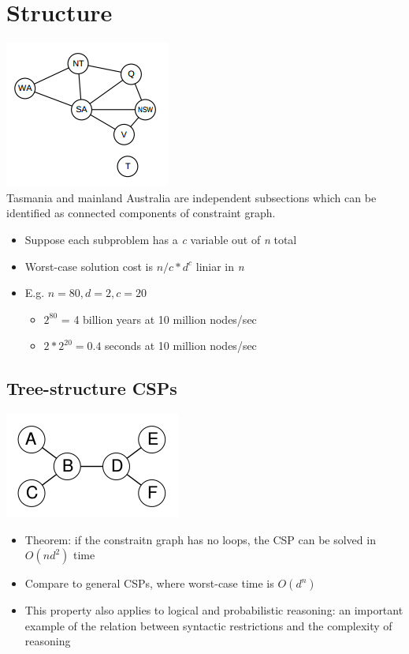 \section{Structure}
\includegraphics[scale=1]{chap1_pics/australiamap.png}\\
Tasmania and mainland Australia are independent subsections which can be identified as connected components of constraint graph. \\

\begin{itemize}
\item Suppose each subproblem has a \textit{c} variable out of \textit{n} total
\item Worst-case solution cost is $ n/c * d^c$ liniar in \textit{n}
\item E.g. $n = 80, d = 2, c =20$
\begin{itemize}
\item $2^{80}$ = 4 billion years at 10 million nodes/sec
\item $2 * 2^{20} = 0.4$ seconds at 10 million nodes/sec
\end{itemize}
\end{itemize} 

\subsection{Tree-structure CSPs}
\includegraphics[scale=1]{chap1_pics/treestructure.png}

\begin{itemize}
\item Theorem: if the constraitn graph has no loops, the CSP can be solved in $O(nd^2)$ time
\item Compare to general CSPs, where worst-case time is $O(d^n)$
\item This property also applies to logical and probabilistic reasoning: an important example of the relation between syntactic restrictions and the complexity of reasoning
\end{itemize}

